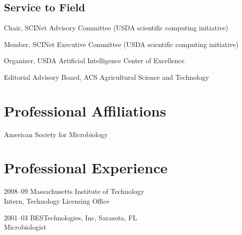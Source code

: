 \documentclass[12pt,letterpaper]{report}
\newcommand{\listitemspace}{0.15em}
\renewenvironment{itemize}
{\begin{list}{}{\setlength{\leftmargin}{0em}
            \setlength{\parskip}{0em}
            \setlength{\itemsep}{\listitemspace}
            \setlength{\parsep}{\listitemspace}}}
    {\end{list}}
\begin{document}
    \subsection*{Service to Field}

    \begin{itemize}

        \item Chair, SCINet Advisory Committee (USDA scientific computing initiative)      
        \item Member, SCINet Executive Committee (USDA scientific computing initiative)
        \item Organizer, USDA Artificial Intelligence  Center of Excellence
        \item Editorial Advisory Board,  ACS Agricultural Science and Technology


    \end{itemize}





    \section*{Professional Affiliations}

    \begin{itemize}

        \item American Society for Microbiology

    \end{itemize}



    \section*{Professional Experience}

    \begin{tablist}

        \item[2008--09] \tab Massachusetts Institute of Technology \\
        			    Intern, Technology Licensing Office
			    
	\item[2001--03] \tab BESTechnologies, Inc, Sarasota, FL \\
				Microbiologist	

    \end{tablist}
\end{document}
